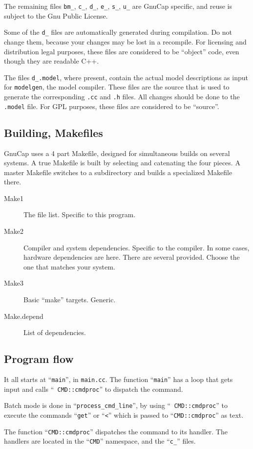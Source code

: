 The remaining files {\tt bm\_\*}, {\tt c\_\*}, {\tt d\_\*}, {\tt e\_\*},
{\tt s\_\*}, {\tt u\_\*} are GnuCap specific, and reuse is subject to the
Gnu Public License.

Some of the {\tt d\_\*} files are automatically generated during
compilation.  Do not change them, because your changes may be lost in
a recompile.  For licensing and distribution legal purposes, these
files are considered to be ``object'' code, even though they are
readable C++.

The files {\tt d\_\*.model}, where present, contain the actual model
descriptions as input for {\tt modelgen}, the model compiler.
These files are the source that is used to generate the corresponding
{\tt .cc} and {\tt .h} files.  All changes should be done to the {\tt
.model} file.  For GPL purposes, these files are considered to be
``source''.
\subsection{Building, Makefiles}

GnuCap uses a 4 part Makefile, designed for simultaneous builds on
several systems.  A true Makefile is built by selecting and catenating
the four pieces.  A master Makefile switches to a subdirectory and
builds a specialized Makefile there.

\begin{description}
\item[Make1] The file list.  Specific to this program.
\item[Make2] Compiler and system dependencies.  Specific to the
  compiler.  In some cases, hardware dependencies are here.  There are
  several provided.  Choose the one that matches your system.
\item[Make3] Basic ``make'' targets.  Generic.
\item[Make.depend] List of dependencies.
\end{description}
\subsection{Program flow}

It all starts at ``{\tt main}'', in {\tt main.cc}.  The function
``{\tt main}'' has a loop that gets input and calls ``{\tt
  CMD::cmdproc}'' to dispatch the command.

Batch mode is done in ``{\tt process\_cmd\_line}'', by using ``{\tt
  CMD::cmdproc}'' to execute the commands ``{\tt get}'' or ``{\tt <}''
which is passed to ``{\tt CMD::cmdproc}'' as text.

The function ``{\tt CMD::cmdproc}'' dispatches the command to its
handler.  The handlers are located in the ``{\tt CMD}'' namespace, and
the ``{\tt c\_\*}'' files.
